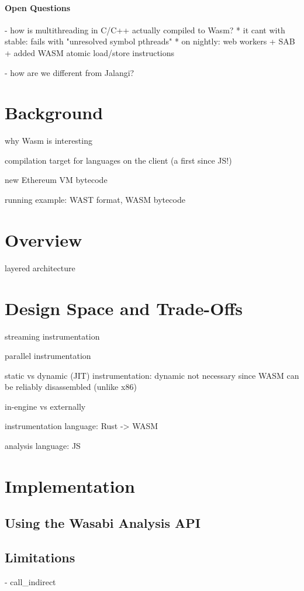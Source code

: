 \documentclass[sigplan,review,anonymous]{acmart}\settopmatter{printfolios=true,printccs=false,printacmref=false}
\newcommand{\name}{Wasabi}
\begin{document}
\paragraph{Open Questions}
- how is multithreading in C/C++ actually compiled to Wasm?
	* it cant with stable: fails with "unresolved symbol pthreads"
	* on nightly: web workers + SAB + added WASM atomic load/store instructions

- how are we different from Jalangi?

\newpage
\section{Background}

why Wasm is interesting

compilation target for languages on the client (a first since JS!)

new Ethereum VM bytecode

running example: WAST format, WASM bytecode

\newpage
\section{Overview}

layered architecture

\newpage
\section{Design Space and Trade-Offs}
streaming instrumentation

parallel instrumentation

static vs dynamic (JIT) instrumentation: dynamic not necessary since WASM can be reliably disassembled (unlike x86)

in-engine vs externally

instrumentation language: Rust -> WASM

analysis language: JS

\newpage
\section{Implementation}

\subsection{Using the \name{} Analysis API}

\subsection{Limitations}
- call\_indirect
\end{document}
